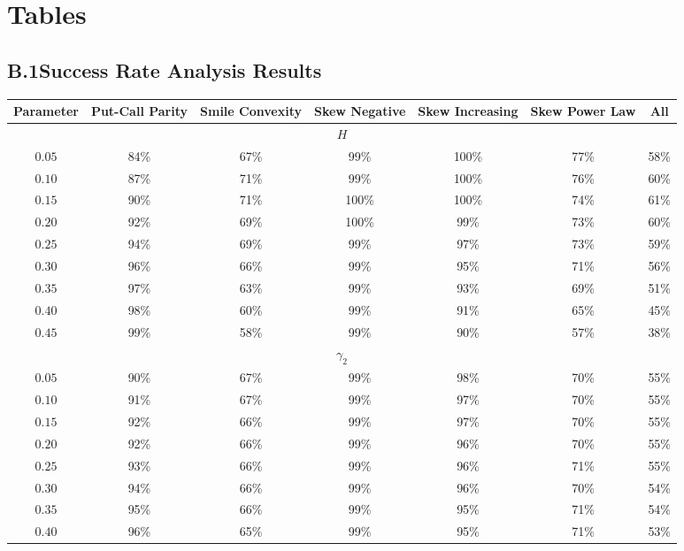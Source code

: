 \section{Tables} \label{sec:Tables}

\subsection*{B.1\quad Success Rate Analysis Results}

\begin{table}[h!]
    \centering
    \small
    \setlength{\tabcolsep}{4pt}
    \begin{tabular}{c|cccccc}
    \toprule
    Parameter & Put-Call Parity & Smile Convexity & Skew Negative & Skew Increasing & Skew Power Law & All \\
    \midrule
    \multicolumn{7}{c}{$H$} \\
    $0.05$ & 84\% & 67\% & 99\% & 100\% & 77\% & 58\% \\
    $0.10$ & 87\% & 71\% & 99\% & 100\% & 76\% & 60\% \\
    $0.15$ & 90\% & 71\% & 100\% & 100\% & 74\% & 61\% \\
    $0.20$ & 92\% & 69\% & 100\% & 99\% & 73\% & 60\% \\
    $0.25$ & 94\% & 69\% & 99\% & 97\% & 73\% & 59\% \\
    $0.30$ & 96\% & 66\% & 99\% & 95\% & 71\% & 56\% \\
    $0.35$ & 97\% & 63\% & 99\% & 93\% & 69\% & 51\% \\
    $0.40$ & 98\% & 60\% & 99\% & 91\% & 65\% & 45\% \\
    $0.45$ & 99\% & 58\% & 99\% & 90\% & 57\% & 38\% \\
    \midrule
    \multicolumn{7}{c}{$\gamma_2$} \\
    $0.05$ & 90\% & 67\% & 99\% & 98\% & 70\% & 55\% \\
    $0.10$ & 91\% & 67\% & 99\% & 97\% & 70\% & 55\% \\
    $0.15$ & 92\% & 66\% & 99\% & 97\% & 70\% & 55\% \\
    $0.20$ & 92\% & 66\% & 99\% & 96\% & 70\% & 55\% \\
    $0.25$ & 93\% & 66\% & 99\% & 96\% & 71\% & 55\% \\
    $0.30$ & 94\% & 66\% & 99\% & 96\% & 70\% & 54\% \\
    $0.35$ & 95\% & 66\% & 99\% & 95\% & 71\% & 54\% \\
    $0.40$ & 96\% & 65\% & 99\% & 95\% & 71\% & 53\% \\

\end{tabular}
\end{table}
